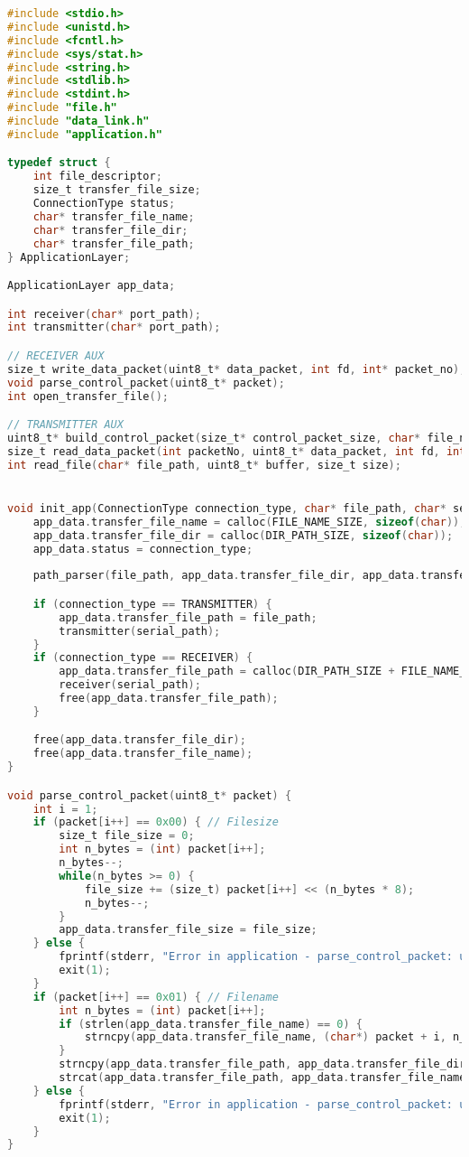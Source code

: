 \begin{lstlisting}[language=C, caption=application.c]
#include <stdio.h>
#include <unistd.h>
#include <fcntl.h>
#include <sys/stat.h>
#include <string.h>
#include <stdlib.h>
#include <stdint.h>
#include "file.h"
#include "data_link.h"
#include "application.h"

typedef struct {
    int file_descriptor;
    size_t transfer_file_size;
    ConnectionType status;
    char* transfer_file_name;
    char* transfer_file_dir;
    char* transfer_file_path;
} ApplicationLayer;

ApplicationLayer app_data;

int receiver(char* port_path);
int transmitter(char* port_path);

// RECEIVER AUX
size_t write_data_packet(uint8_t* data_packet, int fd, int* packet_no);
void parse_control_packet(uint8_t* packet);
int open_transfer_file();

// TRANSMITTER AUX
uint8_t* build_control_packet(size_t* control_packet_size, char* file_name);
size_t read_data_packet(int packetNo, uint8_t* data_packet, int fd, int bytes_read);
int read_file(char* file_path, uint8_t* buffer, size_t size);


void init_app(ConnectionType connection_type, char* file_path, char* serial_path) {
    app_data.transfer_file_name = calloc(FILE_NAME_SIZE, sizeof(char));
    app_data.transfer_file_dir = calloc(DIR_PATH_SIZE, sizeof(char));
    app_data.status = connection_type;
    
    path_parser(file_path, app_data.transfer_file_dir, app_data.transfer_file_name);

    if (connection_type == TRANSMITTER) {
        app_data.transfer_file_path = file_path;
        transmitter(serial_path);
    }
    if (connection_type == RECEIVER) {
        app_data.transfer_file_path = calloc(DIR_PATH_SIZE + FILE_NAME_SIZE, sizeof(char));
        receiver(serial_path);
        free(app_data.transfer_file_path);
    }

    free(app_data.transfer_file_dir);
    free(app_data.transfer_file_name);
}

void parse_control_packet(uint8_t* packet) {
    int i = 1;
    if (packet[i++] == 0x00) { // Filesize
        size_t file_size = 0;
        int n_bytes = (int) packet[i++];
        n_bytes--;
        while(n_bytes >= 0) {
            file_size += (size_t) packet[i++] << (n_bytes * 8);
            n_bytes--;
        }
        app_data.transfer_file_size = file_size;
    } else {
        fprintf(stderr, "Error in application - parse_control_packet: unexpected structure of the control_packet\n");
        exit(1);
    }
    if (packet[i++] == 0x01) { // Filename
        int n_bytes = (int) packet[i++];
        if (strlen(app_data.transfer_file_name) == 0) {
            strncpy(app_data.transfer_file_name, (char*) packet + i, n_bytes);
        }
        strncpy(app_data.transfer_file_path, app_data.transfer_file_dir, DIR_PATH_SIZE);
        strcat(app_data.transfer_file_path, app_data.transfer_file_name);
    } else {
        fprintf(stderr, "Error in application - parse_control_packet: unexpected structure of the control_packet\n");
        exit(1);
    }
}


\end{lstlisting}
